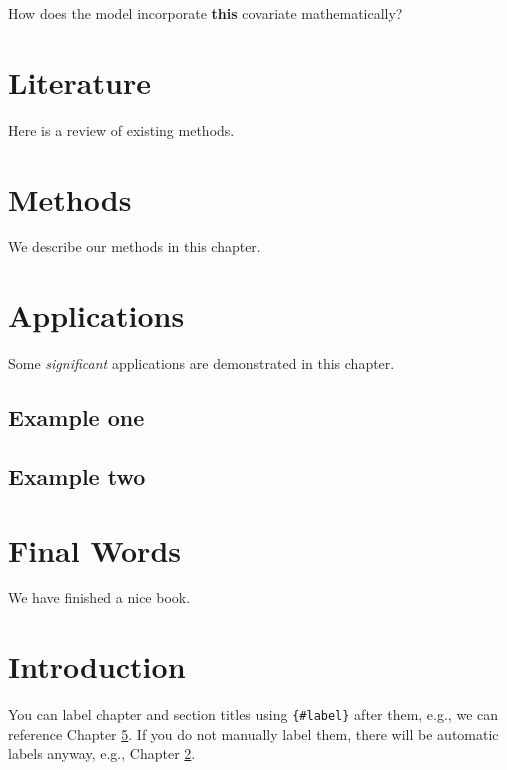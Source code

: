 \documentclass[]{book}
\begin{document}
How does the model incorporate \textbf{this} covariate mathematically?

\vspace{1.75in}

\hypertarget{literature}{%
\chapter{Literature}\label{literature}}

Here is a review of existing methods.

\hypertarget{methods}{%
\chapter{Methods}\label{methods}}

We describe our methods in this chapter.

\hypertarget{applications}{%
\chapter{Applications}\label{applications}}

Some \emph{significant} applications are demonstrated in this chapter.

\hypertarget{example-one}{%
\section{Example one}\label{example-one}}

\hypertarget{example-two}{%
\section{Example two}\label{example-two}}

\hypertarget{final-words}{%
\chapter{Final Words}\label{final-words}}

We have finished a nice book.

\hypertarget{intro}{%
\chapter{Introduction}\label{intro}}

You can label chapter and section titles using \texttt{\{\#label\}} after them, e.g., we can reference Chapter \ref{intro}. If you do not manually label them, there will be automatic labels anyway, e.g., Chapter \ref{methods}.
\end{document}
